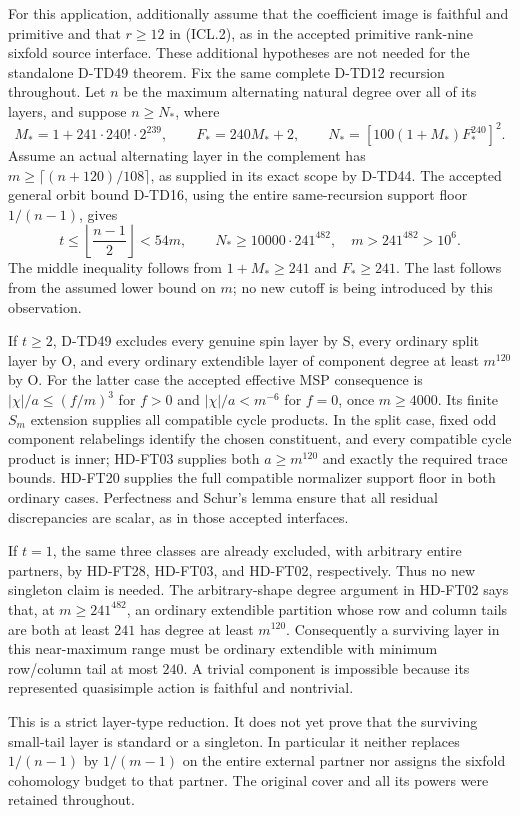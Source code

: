 For this application, additionally assume that the coefficient
image is faithful and primitive and that $r\ge12$ in (ICL.2),
as in the accepted primitive rank-nine sixfold source interface.
These additional hypotheses are not needed for the standalone
D-TD49 theorem.  Fix the same complete D-TD12 recursion throughout.
Let $n$ be
the maximum alternating natural degree over all of its layers,
and suppose $n\ge N_*$, where
\[
 M_*=1+241\cdot240!\cdot2^{239},\qquad F_*=240M_*+2,
 \qquad N_*=[100(1+M_*)F_*^{240}]^2.
 \tag{ICL.19}
\]
Assume an actual alternating layer in the complement has
$m\ge\lceil(n+120)/108\rceil$, as supplied in its exact scope
by D-TD44.  The accepted general orbit bound D-TD16, using the
entire same-recursion support floor $1/(n-1)$, gives
\[
 t\le\left\lfloor\frac{n-1}2\right\rfloor<54m,
 \qquad
 N_*\ge10000\cdot241^{482},\quad m>241^{482}>10^6.
 \tag{ICL.20}
\]
The middle inequality follows from $1+M_*\ge241$ and
$F_*\ge241$.  The last follows from the assumed lower bound
on $m$; no new cutoff is being introduced by this observation.

If $t\ge2$, D-TD49 excludes every genuine spin layer by S,
every ordinary split layer by O, and every ordinary extendible
layer of component degree at least $m^{120}$ by O.
For the latter case the accepted effective MSP consequence is
$|\chi|/a\le(f/m)^3$ for $f>0$ and $|\chi|/a<m^{-6}$ for
$f=0$, once $m\ge4000$.  Its finite $S_m$ extension supplies
all compatible cycle products.  In the split case, fixed odd
component relabelings identify the chosen constituent, and
every compatible cycle product is inner; HD-FT03 supplies
both $a\ge m^{120}$ and exactly the required trace bounds.
HD-FT20 supplies the full compatible normalizer support floor
in both ordinary cases.  Perfectness and Schur's lemma ensure
that all residual discrepancies are scalar, as in those
accepted interfaces.

If $t=1$, the same three classes are already excluded, with
arbitrary entire partners, by HD-FT28, HD-FT03, and HD-FT02,
respectively.  Thus no new singleton claim is needed.
The arbitrary-shape degree argument in HD-FT02 says that, at
$m\ge241^{482}$, an ordinary extendible partition whose row
and column tails are both at least $241$ has degree at least
$m^{120}$.  Consequently a surviving layer in this near-maximum
range must be ordinary extendible with minimum row/column tail
at most $240$.  A trivial component is impossible because its
represented quasisimple action is faithful and nontrivial.

This is a strict layer-type reduction.  It does not yet prove
that the surviving small-tail layer is standard or a singleton.
In particular it neither replaces $1/(n-1)$ by $1/(m-1)$ on
the entire external partner nor assigns the sixfold cohomology
budget to that partner.  The original cover and all its powers
were retained throughout.

